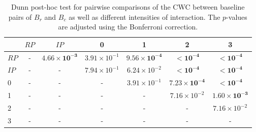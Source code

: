 \begin{table}
\centering
\caption{Dunn post-hoc test for pairwise comparisons of the CWC between baseline pairs of $B_r$ and $B_c$ as well as different intensities of interaction. The $p$-values are adjusted using the Bonferroni correction.}
\label{tab:dunn_coherence}
\begin{tabular}{lcccccc}
\toprule
 & $RP$ & $IP$ & 0 & 1 & 2 & 3 \\
\midrule
$RP$ & - & $\mathbf{4.66 \times 10^{-3}}$ & $3.91 \times 10^{-1}$ & $\mathbf{9.56 \times 10^{-4}}$ & $\mathbf{< 10^{-4}}$ & $\mathbf{< 10^{-4}}$ \\
$IP$ & - & - & $7.94 \times 10^{-1}$ & $6.24 \times 10^{-2}$ & $\mathbf{< 10^{-4}}$ & $\mathbf{< 10^{-4}}$ \\
0 & - & - & - & $3.91 \times 10^{-1}$ & $\mathbf{7.23 \times 10^{-4}}$ & $\mathbf{< 10^{-4}}$ \\
1 & - & - & - & - & $7.16 \times 10^{-2}$ & $\mathbf{1.60 \times 10^{-3}}$ \\
2 & - & - & - & - & - & $7.16 \times 10^{-2}$ \\
3 & - & - & - & - & - & - \\
\bottomrule
\end{tabular}
\end{table}
